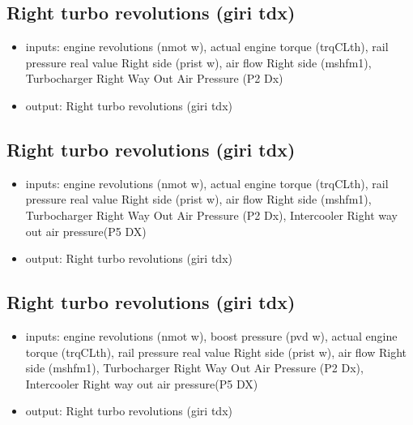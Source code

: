 \subsection{Right turbo revolutions (giri tdx)}
\begin{itemize}
	\item{inputs: engine revolutions (nmot w), actual engine torque (trqCLth), rail pressure real value Right side (prist w), air flow Right side (mshfm1), Turbocharger Right Way Out Air Pressure (P2 Dx)}
	\item{output: Right turbo revolutions (giri tdx)}
\end{itemize}	



\subsection{Right turbo revolutions (giri tdx)}
\begin{itemize}
	\item{inputs: engine revolutions (nmot w), actual engine torque (trqCLth), rail pressure real value Right side (prist w), air flow Right side (mshfm1), Turbocharger Right Way Out Air Pressure (P2 Dx), Intercooler Right way out air pressure(P5 DX)}
	\item{output: Right turbo revolutions (giri tdx)}
\end{itemize}	



\subsection{Right turbo revolutions (giri tdx)}
\begin{itemize}
	\item{inputs: engine revolutions (nmot w), boost pressure (pvd w), actual engine torque (trqCLth), rail pressure real value Right side (prist w), air flow Right side (mshfm1), Turbocharger Right Way Out Air Pressure (P2 Dx), Intercooler Right way out air pressure(P5 DX)}
	\item{output: Right turbo revolutions (giri tdx)}
\end{itemize}	



